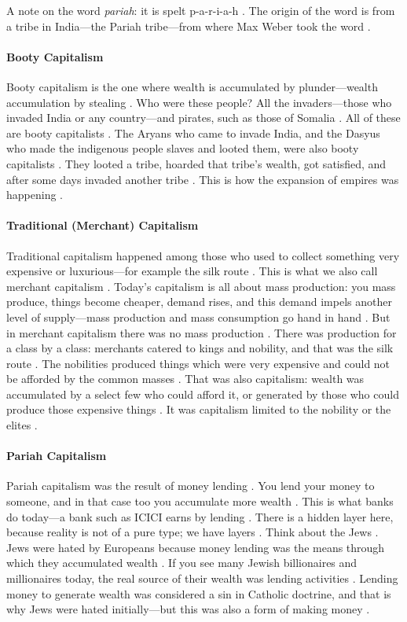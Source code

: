 \begin{ExampleBox}
A note on the word \textit{pariah}: it is spelt p-a-r-i-a-h . The origin of the word is from a tribe in India---the Pariah tribe---from where Max Weber took the word .
\end{ExampleBox}

\paragraph{Booty Capitalism}
Booty capitalism is the one where wealth is accumulated by plunder---wealth accumulation by stealing .
Who were these people? All the invaders---those who invaded India or any country---and pirates, such as those of Somalia . All of these are booty capitalists .
The Aryans who came to invade India, and the Dasyus who made the indigenous people slaves and looted them, were also booty capitalists . They looted a tribe, hoarded that tribe's wealth, got satisfied, and after some days invaded another tribe . This is how the expansion of empires was happening .

\paragraph{Traditional (Merchant) Capitalism}
Traditional capitalism happened among those who used to collect something very expensive or luxurious---for example the silk route . This is what we also call merchant capitalism .
Today's capitalism is all about mass production: you mass produce, things become cheaper, demand rises, and this demand impels another level of supply---mass production and mass consumption go hand in hand .
But in merchant capitalism there was no mass production . There was production for a class by a class: merchants catered to kings and nobility, and that was the silk route .
The nobilities produced things which were very expensive and could not be afforded by the common masses . That was also capitalism: wealth was accumulated by a select few who could afford it, or generated by those who could produce those expensive things . It was capitalism limited to the nobility or the elites .

\paragraph{Pariah Capitalism}
Pariah capitalism was the result of money lending . You lend your money to someone, and in that case too you accumulate more wealth .
This is what banks do today---a bank such as ICICI earns by lending . There is a hidden layer here, because reality is not of a pure type; we have layers .
Think about the Jews . Jews were hated by Europeans because money lending was the means through which they accumulated wealth . If you see many Jewish billionaires and millionaires today, the real source of their wealth was lending activities . Lending money to generate wealth was considered a sin in Catholic doctrine, and that is why Jews were hated initially---but this was also a form of making money .

